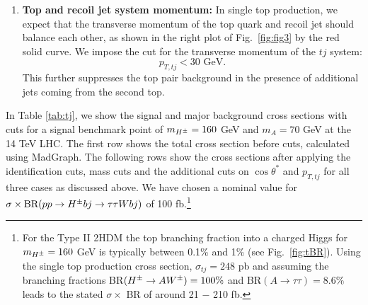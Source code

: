 \begin{enumerate}
\item\textbf{Top and recoil jet system momentum:} In single top production, we expect that the transverse momentum of the top quark and recoil jet should balance each other, as shown in the right plot of Fig.~\ref{fig:fig3} by the red solid curve.  We impose the cut for the transverse momentum of  the $tj$ system: 
\begin{equation}
p_{T,tj} < 30 \text{ GeV}.
\label{eqPT}
\end{equation}
This further suppresses the top pair background in the presence of additional jets coming from the   second top.
 
\end{enumerate}



In Table \ref{tab:tj}, we show the signal and  major  background cross sections with cuts for a signal benchmark point of $m_{H^{\pm}} = 160$ GeV and $m_A =  70$ GeV at the 14 TeV LHC. The first row shows the total cross section before cuts,  calculated using MadGraph.    The following rows show the cross sections after applying the identification cuts, mass cuts and the additional cuts on $\cos\theta^*$ and $p_{T,tj}$ for all three cases as discussed above. We have chosen a nominal value for $\sigma \times \text{BR}( p p  \rightarrow H^{\pm} b j \rightarrow \tau \tau W bj)$ of 100 fb.\footnote{For the Type II 2HDM the top branching fraction into a charged Higgs for $m_{H^{\pm}}=160$ GeV is typically  between 0.1\% and 1\% (see Fig.~\ref{fig:tBR}). Using the single top production cross section, $\sigma_{tj}=248$ pb \cite{Kidonakis:2012db} and assuming  the branching fractions BR$(H^{\pm} \to AW^{\pm})  = 100 \%$ and BR$(A \to \tau\tau)=8.6 \%$ leads to the stated $\sigma\times$ BR of around 21 $-$ 210 fb.  }



